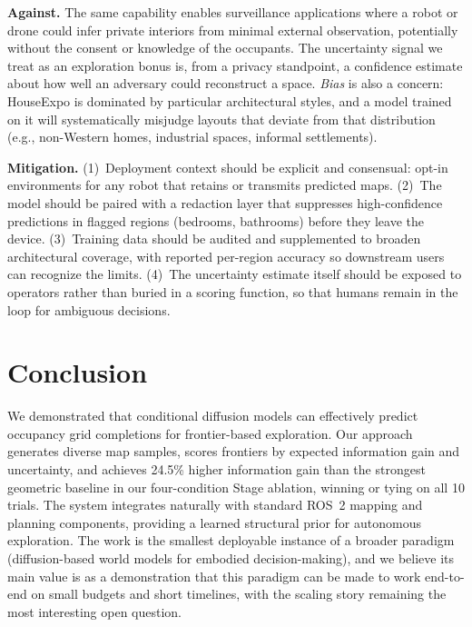 \documentclass[conference]{IEEEtran}
\begin{document}
\textbf{Against.} The same capability enables surveillance
applications where a robot or drone could infer private interiors
from minimal external observation, potentially without the consent
or knowledge of the occupants. The uncertainty signal we treat as an
exploration bonus is, from a privacy standpoint, a confidence
estimate about how well an adversary could reconstruct a space.
\emph{Bias} is also a concern: HouseExpo is dominated by particular
architectural styles, and a model trained on it will systematically
misjudge layouts that deviate from that distribution (e.g.,
non-Western homes, industrial spaces, informal settlements).

\textbf{Mitigation.} (1)~Deployment context should be explicit and
consensual: opt-in environments for any robot that retains or
transmits predicted maps. (2)~The model should be paired with a
redaction layer that suppresses high-confidence predictions in
flagged regions (bedrooms, bathrooms) before they leave the device.
(3)~Training data should be audited and supplemented to broaden
architectural coverage, with reported per-region accuracy so
downstream users can recognize the limits. (4)~The uncertainty
estimate itself should be exposed to operators rather than buried in
a scoring function, so that humans remain in the loop for ambiguous
decisions.

\section{Conclusion}

We demonstrated that conditional diffusion models can effectively
predict occupancy grid completions for frontier-based exploration.
Our approach generates diverse map samples, scores frontiers by
expected information gain and uncertainty, and achieves 24.5\%
higher information gain than the strongest geometric baseline in our
four-condition Stage ablation, winning or tying on all 10 trials. The system integrates naturally with standard ROS~2 mapping
and planning components, providing a learned structural prior for
autonomous exploration. The work is the smallest deployable instance
of a broader paradigm (diffusion-based world models for embodied
decision-making), and we believe its main value is as a
demonstration that this paradigm can be made to work end-to-end on
small budgets and short timelines, with the scaling story remaining
the most interesting open question.
\end{document}
